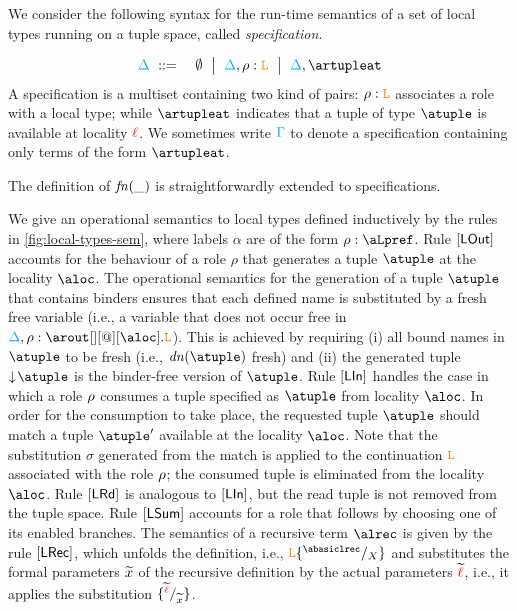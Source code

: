 We consider the following syntax for the run-time semantics of a set of local types running on a 
tuple space, called {\em specification}.

\begin{eqnarray*}
  \envmv & \bnfdef & \emptyset \bnfmid
                  \envmv, \arole :  \aL \bnfmid
                  \envmv, \artupleat                  
\end{eqnarray*}
%
A specification is a multiset containing two kind of pairs:  $\rho :  \texttt{\textcolor{orange}L}$   associates a 
role with a local type; while $\artupleat$  indicates that a 
tuple of type $\atuple$ is available at locality ${\color{red}\ell}$. 
%
We sometimes write $\textcolor{cyan}{\Gamma}$ to denote a specification containing only
terms of the form $\artupleat$. 

The definition of ${\it fn}(\_)$ is straightforwardly  extended to specifications. 

We give an operational semantics to local types defined inductively by 
the rules in \cref{fig:local-types-sem}, where labels $\alpha$ are of the form 
$\arole : \aLpref$. Rule $\mathsf{[LOut]}$ 
accounts  for the behaviour of a role $\rho$ that  generates a tuple $\atuple$ at the 
locality $\aloc$. The operational semantics for the generation of a tuple $\atuple$ that 
contains binders ensures that  each defined name  is substituted by a fresh free variable 
 (i.e., a variable that does not occur free in $\envmv, \arole : \arout[][@][\aloc].\aL$).
This is achieved by requiring  (i) all bound names in $\atuple$ to be fresh (i.e., $\dn\atuple$  fresh) and 
(ii)  the generated tuple $\eraseB\atuple$ is the binder-free version of $\atuple$. 
Rule $\mathsf{[LIn]}$ handles the case in which a role $\rho$
consumes  a tuple specified as $\atuple$ from locality $\aloc$. In order for the consumption to
take place, the  requested tuple $\atuple$ should match  a tuple $\atuple'$ available 
at the locality $\aloc$. 
Note that the substitution $\sigma$ generated from the match is applied 
to the continuation $\texttt{\textcolor{orange}L}$ associated with the role $\rho$; the
consumed tuple is eliminated from the locality $\aloc$. 
%
Rule $\mathsf{[LRd]}$ is analogous to $\mathsf{[LIn]}$, but the 
read tuple is not removed from the tuple space.
%
Rule $\mathsf{[LSum]}$ accounts for a role that follows by choosing one of 
its enabled branches. 
%
The semantics of a recursive term $\alrec$ is given by the rule
 $\mathsf{[LRec]}$, which unfolds the  definition, i.e., $\aL\sust X{\abasiclrec}$
 and substitutes the formal parameters $\widetilde{x}$ of the recursive
 definition by the actual parameters $\widetilde{{\color{red}\ell}}$, i.e., it applies
 the substitution $\{^{\widetilde{{\color{red}\ell}}} / _{\widetilde{x}}\}$.
 

